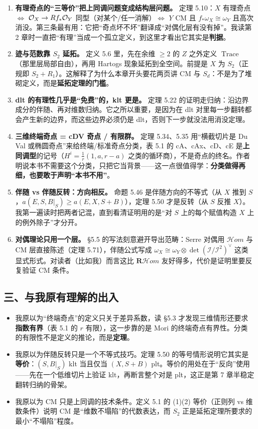 \begin{enumerate}
\item \textbf{有理奇点的“三等价”把上同调问题变成结构层问题。} 定理 5.10：$X$ 有理奇点 $\Longleftrightarrow$ $\mathcal{O}_X\to Rf_*\mathcal{O}_Y$ 同型（对某个/任一消解）$\Longleftrightarrow$ $Y$ CM 且 $f_*\omega_X\cong\omega_Y$ 且高次消没。第三条最有用：它把“奇点坏不坏”翻译成“对偶化层有没有掉”。我读第 2 章时一直把“有理”当成一个孤立定义，到这里才看出它其实是\textbf{判据}。
\item \textbf{迹与范数靠 $S_2$ 延拓。} 定义 5.6 里，先在余维 $\ge2$ 的 $Z$ 之外定义 $\operatorname{Trace}$（那里层局部自由），再用 Hartogs 现象延拓到全空间。前提是 $X$ 为 $S_2$（正规即 $S_2+R_1$）。这解释了为什么本章开头要花两页讲 CM 与 $S_d$：不是为了堆砌定义，而是\textbf{延拓定理的门槛}。
\item \textbf{dlt 的有理性几乎是“免费”的，klt 更是。} 定理 5.22 的证明走归纳：沿边界成分的伴随、再对维数归纳。它之所以重要，是因为在 dlt 对里每一步翻转都会产生新的边界，而这些边界必须仍是 dlt，否则下一步就没法用消没定理。
\item \textbf{三维终端奇点 = cDV 奇点 / 有限群。} 定理 5.34、5.35 用“横截切片是 Du Val 或椭圆奇点”来给终端/标准奇点分类，表 5.1 的 cA、cAx、cD、cE 是\textbf{上同调型}的记号（$H^i=\frac1r(1,a,r-a)$ 之类的循环商），不是奇点的终名。作者明说本书不需要这个分类，只把它当背景——这一点很值得学：\textbf{分类做得再细，也要敢于声明“本书不用”}。
\item \textbf{伴随 vs 伴随反转：方向相反。} 命题 5.46 是伴随方向的不等式（从 $X$ 推到 $S$，$a(E,S,B|_S)\ge a(E,X,S+B)$），定理 5.50 才是反转（从 $S$ 反推 $X$）。我第一遍读时把两者记混，直到看清证明用的是“对 $S$ 上的每个赋值构造 $X$ 上的例外除子”才分开。
\item \textbf{对偶理论只用一个层。} \S5.5 的写法刻意避开导出范畴：Serre 对偶用 $\mathcal{H}om$ 与 CM 层直接陈述（定理 5.71），伴随公式写成 $\omega_X\cong\omega_Y\otimes\det(\mathcal{I}/\mathcal{I}^2)^\vee$ 这类显式形式。对读者（比如我）而言这比 $\mathbf{R}\mathcal{H}om$ 友好得多，代价是证明里要反复验证 CM 条件。
\end{enumerate}

\subsection*{三、与我原有理解的出入}

\begin{itemize}
\item 我原以为“终端奇点”的定义只关于差异系数，读 \S5.3 才发现三维情形还要求\textbf{指数有界}（表 5.1 的 $r$ 有限），这一步靠的是 Mori 的终端奇点有界性。分类的有限性不是定义的推论，而是\textbf{定理}。
\item 我原以为伴随反转只是一个不等式技巧。定理 5.50 的等号情形说明它其实是\textbf{等价}：$(S,B|_S)$ klt 当且仅当 $(X,S+B)$ plt。等价的用处在于“反向”使用——先在一个低维切片上验证 klt，再断言整个对是 plt，这正是第 7 章半稳定翻转归纳的骨架。
\item 我原以为 CM 只是上同调的技术条件。定义 5.1 的 (1)(2) 等价（正则列 vs 维数条件）说明 CM 是“维数不塌陷”的代数表达，而 $S_2$ 正是延拓定理所要求的最小“不塌陷”程度。
\end{itemize}

